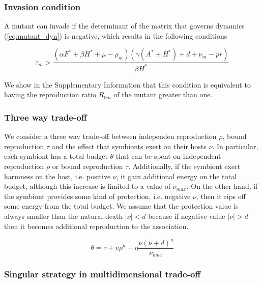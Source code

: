 \documentclass[11pt]{article}
\begin{document}
\subsubsection*{Invasion condition}
A mutant can invade if the determinant of the matrix that governs dynamics (\ref{eq:mutant_dyn}) is negative, which results in the following conditions

\begin{equation}
	\tau_m > \frac{(\alpha  F^* + \beta  H^* + \mu  - \rho_m) (\gamma  (A^* + H^*) + d + \nu_m - p r)}{\beta  H^*}
	\label{eq:invasion}
\end{equation}

We show in the Supplementary Information that this condition is equivalent to having the reproduction ratio $R_{0m}$ of the mutant greater than one.

\subsubsection*{Three way trade-off}
We consider a three way trade-off between independen reproduction $\rho$, bound reproduction $\tau$ and the effect that symbionts exert on their hosts $\nu$. In particular, each symbiont has a total budget $\theta$ that can be spent on independent reproduction $\rho$ or bound reproduction $\tau$. Additionally, if the symbiont exert harmness on the host, i.e. positive $\nu$, it gain additional energy on the total budget, although this increase is limited to a value of $\nu_{max}$. On the other hand, if the symbiont provides some kind of protection, i.e. negative $\nu$, then it rips off some energy from the total budget. We assume that the protection value is always smaller than the natural death $\mid \nu \mid < d$ because if negative value $\mid \nu \mid > d$ then it becomes additional reproduction to the association. 

\begin{equation}
	\theta = \tau + v \rho^h -  \eta \frac{\nu (\nu + d)^g}{\nu_{max}}
	\label{eq:tradeoff}
\end{equation}

\subsubsection*{Singular strategy in multidimensional trade-off}
\end{document}
